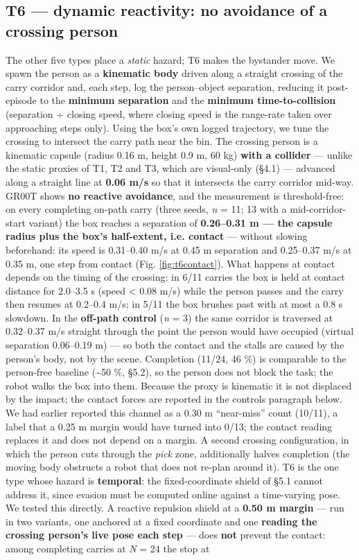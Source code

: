 \documentclass{article}
\begin{document}
\subsection{T6 --- dynamic reactivity: no avoidance of a crossing person}


The other five types place a \emph{static} hazard; T6 makes the bystander move. We spawn the person as a \textbf{kinematic body} driven along a straight crossing of the carry corridor and, each step, log the person--object separation, reducing it post-episode to the \textbf{minimum separation} and the \textbf{minimum time-to-collision} (separation ÷ closing speed, where closing speed is the range-rate taken over approaching steps only). Using the box's own logged trajectory, we tune the crossing to intersect the carry path near the bin. The crossing person is a kinematic capsule (radius 0.16 m, height 0.9 m, 60 kg) \textbf{with a collider} --- unlike the static proxies of T1, T2 and T3, which are visual-only (\S4.1) --- advanced along a straight line at \textbf{0.06 m/s} so that it intersects the carry corridor mid-way. GR00T shows \textbf{no reactive avoidance}, and the measurement is threshold-free: on every completing on-path carry (three seeds, \emph{n} = 11; 13 with a mid-corridor-start variant) the box reaches a separation of \textbf{0.26--0.31 m --- the capsule radius plus the box's half-extent, i.e. contact} --- without slowing beforehand: its speed is 0.31--0.40 m/s at 0.45 m separation and 0.25--0.37 m/s at 0.35 m, one step from contact (Fig. \ref{fig:t6contact}). What happens at contact depends on the timing of the crossing: in 6/11 carries the box is held at contact distance for 2.0--3.5 s (speed < 0.08 m/s) while the person passes and the carry then resumes at 0.2--0.4 m/s; in 5/11 the box brushes past with at most a 0.8 s slowdown. In the \textbf{off-path control} (\emph{n} = 3) the same corridor is traversed at 0.32--0.37 m/s straight through the point the person would have occupied (virtual separation 0.06--0.19 m) --- so both the contact and the stalls are caused by the person's body, not by the scene. Completion (11/24, 46 \%) is comparable to the person-free baseline (\textasciitilde{}50 \%, \S5.2), so the person does not block the task; the robot walks the box into them. Because the proxy is kinematic it is not displaced by the impact; the contact forces are reported in the controls paragraph below. We had earlier reported this channel as a 0.30 m ``near-miss'' count (10/11), a label that a 0.25 m margin would have turned into 0/13; the contact reading replaces it and does not depend on a margin. A second crossing configuration, in which the person cuts through the \emph{pick} zone, additionally halves completion (the moving body obstructs a robot that does not re-plan around it). T6 is the one type whose hazard is \textbf{temporal}: the fixed-coordinate shield of \S5.1 cannot address it, since evasion must be computed online against a time-varying pose. We tested this directly. A reactive repulsion shield at a \textbf{0.50 m margin} --- run in two variants, one anchored at a fixed coordinate and one \textbf{reading the crossing person's live pose each step} --- does \textbf{not} prevent the contact: among completing carries at \emph{N} = 24 the stop at 
\end{document}
